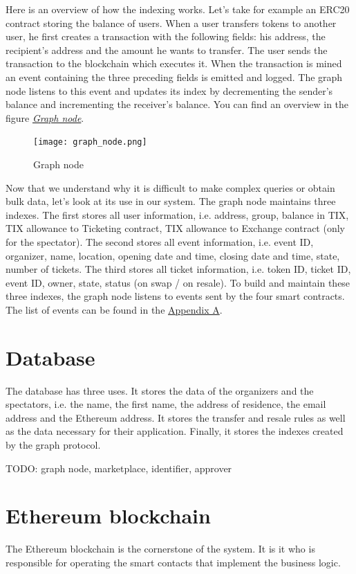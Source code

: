 \documentclass[a4paper,11pt,oneside]{report}
\begin{document}
Here is an overview of how the indexing works. Let's take for example an ERC20 contract storing the balance of users. When a user transfers tokens to another user, he first creates a transaction with the following fields: his address, the recipient's address and the amount he wants to transfer. The user sends the transaction to the blockchain which executes it. When the transaction is mined an event containing the three preceding fields is emitted and logged. The graph node listens to this event and updates its index by decrementing the sender's balance and incrementing the receiver's balance. You can find an overview in the figure \hyperref[fig:graph_node]{ \textit{Graph node}}.

\begin{figure}[h!] 
  \centering
  \texttt{[image: graph\_node.png]}
  \caption{Graph node}
  \label{fig:graph_node}
\end{figure}

Now that we understand why it is difficult to make complex queries or obtain bulk data, let's look at its use in our system. The graph node maintains three indexes. The first stores all user information, i.e. address, group, balance in TIX, TIX allowance to Ticketing contract, TIX allowance to Exchange contract (only for the spectator). The second stores all event information, i.e. event ID, organizer, name, location, opening date and time, closing date and time, state, number of tickets. The third stores all ticket information, i.e. token ID, ticket ID, event ID, owner, state, status (on swap / on resale). To build and maintain these three indexes, the graph node listens to events sent by the four smart contracts. The list of events can be found in the \hyperref[sec:appendix_a]{Appendix A}.

\section{Database}
The database has three uses. It stores the data of the organizers and the spectators, i.e. the name, the first name, the address of residence, the email address and the Ethereum address. It stores the transfer and resale rules as well as the data necessary for their application. Finally, it stores the indexes created by the graph protocol.

TODO: graph node, marketplace, identifier, approver

\section{Ethereum blockchain}
The Ethereum blockchain is the cornerstone of the system. It is it who is responsible for operating the smart contacts that implement the business logic.
\end{document}
